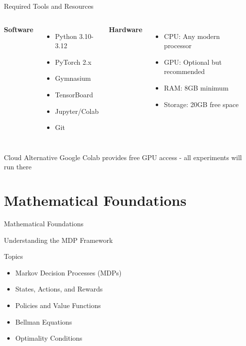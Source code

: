 \documentclass[aspectratio=169,10pt]{beamer}
\begin{document}
\begin{frame}{Required Tools and Resources}
\begin{columns}
\textbf{Software}
\begin{itemize}
    \item Python 3.10-3.12
    \item PyTorch 2.x
    \item Gymnasium
    \item TensorBoard
    \item Jupyter/Colab
    \item Git
\end{itemize}

\textbf{Hardware}
\begin{itemize}
    \item CPU: Any modern processor
    \item GPU: Optional but recommended
    \item RAM: 8GB minimum
    \item Storage: 20GB free space
\end{itemize}
\end{columns}

\begin{alertblock}{Cloud Alternative}
Google Colab provides free GPU access - all experiments will run there
\end{alertblock}
\end{frame}

\section{Mathematical Foundations}

\begin{frame}{Mathematical Foundations}
\begin{center}
\Large{Understanding the MDP Framework}
\end{center}

\begin{block}{Topics}
\begin{itemize}
    \item Markov Decision Processes (MDPs)
    \item States, Actions, and Rewards
    \item Policies and Value Functions
    \item Bellman Equations
    \item Optimality Conditions
\end{itemize}
\end{block}
\end{frame}
\end{document}
